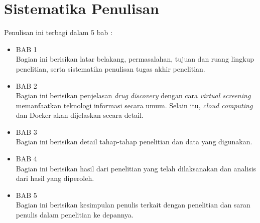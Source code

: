 \section{Sistematika Penulisan}
Penulisan ini terbagi dalam 5 bab :
\begin{itemize}
	\item BAB 1 \babSatu \\
	Bagian ini berisikan latar belakang, permasalahan, tujuan dan ruang lingkup penelitian, serta sistematika penulisan tugas akhir penelitian. 
	\item BAB 2 \babDua \\
	Bagian ini berisikan penjelasan \textit{drug discovery} dengan cara \textit{virtual screening} memanfaatkan teknologi informasi secara umum. Selain itu, \textit{cloud computing} dan Docker akan dijelaskan secara detail.
	\item BAB 3 \babTiga \\
	Bagian ini berisikan detail tahap-tahap penelitian dan data yang digunakan.
	\item BAB 4 \babEmpat \\
	Bagian ini berisikan hasil dari penelitian yang telah dilaksanakan dan analisis dari hasil yang diperoleh.
	\item BAB 5 \kesimpulan \\
	Bagian ini berisikan kesimpulan penulis terkait dengan penelitian dan saran penulis dalam penelitian ke depannya.
\end{itemize}


